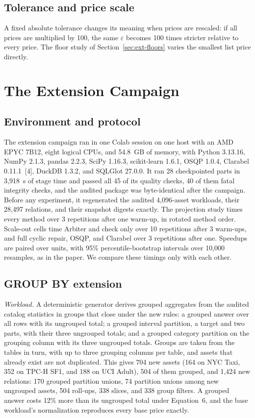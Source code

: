 \documentclass[10pt]{article}
\newcommand{\tol}{\varepsilon}
\begin{document}
\subsection{Tolerance and price scale}
A fixed absolute tolerance changes its meaning when prices are rescaled: if all prices are multiplied by 100, the same $\tol$ becomes 100 times stricter relative to every price. The floor study of Section~\ref{sec:ext-floors} varies the smallest list price directly.

\section{The Extension Campaign}

\subsection{Environment and protocol}
The extension campaign ran in one Colab session on one host with an AMD EPYC 7B12, eight logical CPUs, and 54.8~GB of memory, with Python 3.13.16, NumPy 2.1.3, pandas 2.2.3, SciPy 1.16.3, scikit-learn 1.6.1, OSQP 1.0.4, Clarabel 0.11.1~[4], DuckDB 1.3.2, and SQLGlot 27.0.0. It ran 28 checkpointed parts in 3{,}918~s of stage time and passed all 45 of its quality checks, 40 of them fatal integrity checks, and the audited package was byte-identical after the campaign. Before any experiment, it regenerated the audited 4{,}096-asset workloads, their 28{,}497 relations, and their snapshot digests exactly. The projection study times every method over 3 repetitions after one warm-up, in rotated method order. Scale-out cells time Arbiter and check only over 10 repetitions after 3 warm-ups, and full cyclic repair, OSQP, and Clarabel over 3 repetitions after one. Speedups are paired over units, with 95\% percentile-bootstrap intervals over 10{,}000 resamples, as in the paper. We compare these timings only with each other.

\subsection{GROUP BY extension}
\emph{Workload.} A deterministic generator derives grouped aggregates from the audited catalog statistics in groups that close under the new rules: a grouped answer over all rows with its ungrouped total; a grouped interval partition, a target and two parts, with their three ungrouped totals; and a grouped category partition on the grouping column with its three ungrouped totals. Groups are taken from the tables in turn, with up to three grouping columns per table, and assets that already exist are not duplicated. This gives 704 new assets (164 on NYC Taxi, 352 on TPC-H SF1, and 188 on UCI Adult), 504 of them grouped, and 1{,}424 new relations: 170 grouped partition unions, 74 partition unions among new ungrouped assets, 504 roll-ups, 338 slices, and 338 group filters. A grouped answer costs 12\% more than its ungrouped total under Equation~6, and the base workload's normalization reproduces every base price exactly.
\end{document}
